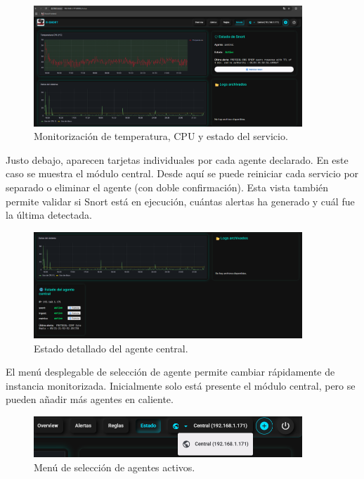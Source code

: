 \documentclass[11pt,a4paper,twoside]{report}
\begin{document}
\begin{figure}[H]
	\centering
	\includegraphics[width=0.9\textwidth]{configuracion/5.png}
	\caption{Monitorización de temperatura, CPU y estado del servicio.}
	\label{fig:estado-central}
\end{figure}

Justo debajo, aparecen tarjetas individuales por cada agente declarado. En este caso se muestra el módulo central. Desde aquí se puede reiniciar cada servicio por separado o eliminar el agente (con doble confirmación). Esta vista también permite validar si Snort está en ejecución, cuántas alertas ha generado y cuál fue la última detectada.

\begin{figure}[H]
	\centering
	\includegraphics[width=0.9\textwidth]{configuracion/6.png}
	\caption{Estado detallado del agente central.}
	\label{fig:estado-agente-central}
\end{figure}

\newpage

El menú desplegable de selección de agente permite cambiar rápidamente de instancia monitorizada. Inicialmente solo está presente el módulo central, pero se pueden añadir más agentes en caliente.

\begin{figure}[H]
	\centering
	\includegraphics[width=0.9\textwidth]{configuracion/7.png}
	\caption{Menú de selección de agentes activos.}
	\label{fig:selector-agentes}
\end{figure}
\end{document}
